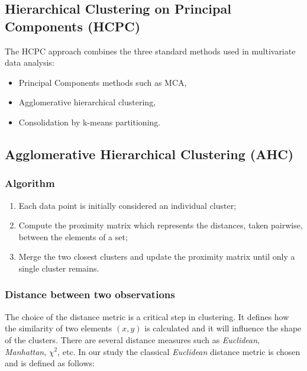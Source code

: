 \documentclass[
]{book}
\providecommand{\tightlist}{%
  \setlength{\itemsep}{0pt}\setlength{\parskip}{0pt}}
\begin{document}
\hypertarget{hcpc}{%
\subsection{Hierarchical Clustering on Principal Components (HCPC)}\label{hcpc}}

The HCPC approach combines the three standard methods used in multivariate data analysis:

\begin{itemize}
\tightlist
\item
  Principal Components methods such as MCA,
\item
  Agglomerative hierarchical clustering,
\item
  Consolidation by k-means partitioning.
\end{itemize}

\hypertarget{agglomerative-hierarchical-clustering-ahc}{%
\subsection{Agglomerative Hierarchical Clustering (AHC)}\label{agglomerative-hierarchical-clustering-ahc}}

\hypertarget{algorithm-1}{%
\subsubsection*{Algorithm}\label{algorithm-1}}

\begin{enumerate}
\def\labelenumi{\arabic{enumi}.}
\tightlist
\item
  Each data point is initially considered an individual cluster;
\item
  Compute the proximity matrix which represents the distances, taken pairwise, between the elements of a set;
\item
  Merge the two closest clusters and update the proximity matrix until only a single cluster remains.
\end{enumerate}

\hypertarget{distance-between-two-observations}{%
\subsubsection*{Distance between two observations}\label{distance-between-two-observations}}

The choice of the distance metric is a critical step in clustering. It defines how the similarity of two elements \((x, y)\) is calculated and it will influence the shape of the clusters. There are several distance measures such as \emph{Euclidean}, \emph{Manhattan}, \(\chi^2\), etc. In our study the classical \emph{Euclidean} distance metric is chosen and is defined as follows:
\end{document}
